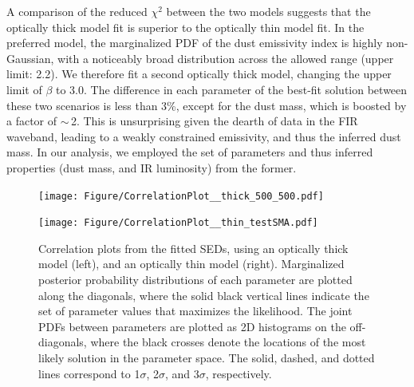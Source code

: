 \documentclass[twocolumn,apj,numberedappendix]{emulateapj}
\begin{document}
A comparison of the reduced $\chi^2$ between the two models suggests that the optically thick model fit is superior to the optically thin model fit. In the preferred model, the marginalized PDF of the dust emissivity index is highly non-Gaussian, with a noticeably broad distribution across
the allowed range (upper limit: 2.2). We therefore fit a second optically thick model, changing the upper limit of $\beta$ to 3.0. The difference in each
parameter of the best-fit solution between these two scenarios is less than 3\%, except for the dust mass, which is boosted by a factor of $\sim$\,2. This is
unsurprising given the dearth of data in the FIR waveband, leading to a weakly constrained emissivity, and thus the inferred dust mass.
In our analysis, we employed the set of parameters and thus inferred properties (dust mass, and IR luminosity) from the former.


\begin{figure}[!tbph]
\centering
\begin{minipage}{0.5\textwidth}
\hspace{-1cm}
\texttt{[image: Figure/CorrelationPlot\_\_thick\_500\_500.pdf]}
\end{minipage}
\hspace{-0.9cm}
\begin{minipage}{0.5\textwidth}
\texttt{[image: Figure/CorrelationPlot\_\_thin\_testSMA.pdf]}
\end{minipage}
\caption{Correlation plots from the fitted SEDs, using an optically thick
model (left), and an optically thin model (right). Marginalized posterior probability
distributions of each
parameter are plotted along the diagonals, where the solid black vertical lines indicate the set of parameter values that maximizes the likelihood. The joint PDFs between parameters are plotted as 2D histograms on the off-diagonals, where the black crosses denote the
locations of the most likely solution in the parameter space. The solid, dashed, and dotted lines correspond to 1$\sigma$, 2$\sigma$, and $3\sigma$, respectively. 
\label{fig:sedlikelihood}}
\end{figure}
\end{document}
